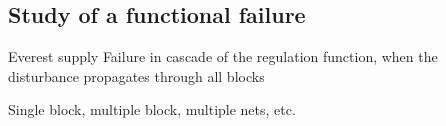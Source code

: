 \subsection{Study of a functional failure}
Everest supply
Failure in cascade of the regulation function, when the disturbance propagates through all blocks

Single block, multiple block, multiple nets, etc.
